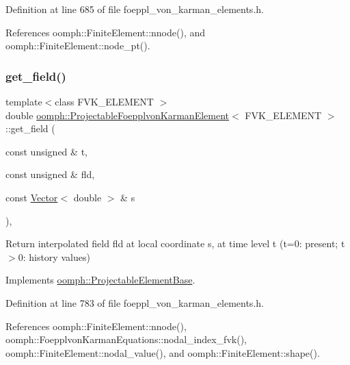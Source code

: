 Definition at line 685 of file foeppl\+\_\+von\+\_\+karman\+\_\+elements.\+h.



References oomph\+::\+Finite\+Element\+::nnode(), and oomph\+::\+Finite\+Element\+::node\+\_\+pt().

\mbox{\label{classoomph_1_1ProjectableFoepplvonKarmanElement_a762989fdeb0489dec57bb386ea6ebf58}} 
\subsubsection{\texorpdfstring{get\+\_\+field()}{get\_field()}}
{\footnotesize\ttfamily template$<$class F\+V\+K\+\_\+\+E\+L\+E\+M\+E\+NT $>$ \\
double \hyperlink{classoomph_1_1ProjectableFoepplvonKarmanElement}{oomph\+::\+Projectable\+Foepplvon\+Karman\+Element}$<$ F\+V\+K\+\_\+\+E\+L\+E\+M\+E\+NT $>$\+::get\+\_\+field (\begin{DoxyParamCaption}\item[{const unsigned \&}]{t,  }\item[{const unsigned \&}]{fld,  }\item[{const \hyperlink{classoomph_1_1Vector}{Vector}$<$ double $>$ \&}]{s }\end{DoxyParamCaption})\hspace{0.3cm}{\ttfamily [inline]}, {\ttfamily [virtual]}}



Return interpolated field fld at local coordinate s, at time level t (t=0\+: present; t$>$0\+: history values) 



Implements \hyperlink{classoomph_1_1ProjectableElementBase_ae4da5b565b6d333be2f5920f7be763cd}{oomph\+::\+Projectable\+Element\+Base}.



Definition at line 783 of file foeppl\+\_\+von\+\_\+karman\+\_\+elements.\+h.



References oomph\+::\+Finite\+Element\+::nnode(), oomph\+::\+Foepplvon\+Karman\+Equations\+::nodal\+\_\+index\+\_\+fvk(), oomph\+::\+Finite\+Element\+::nodal\+\_\+value(), and oomph\+::\+Finite\+Element\+::shape().

